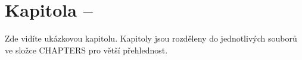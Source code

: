\chapter{Kapitola --}
Zde vidíte ukázkovou kapitolu. 
Kapitoly jsou rozděleny do jednotlivých souborů ve složce CHAPTERS pro větší přehlednost. 

\newpage